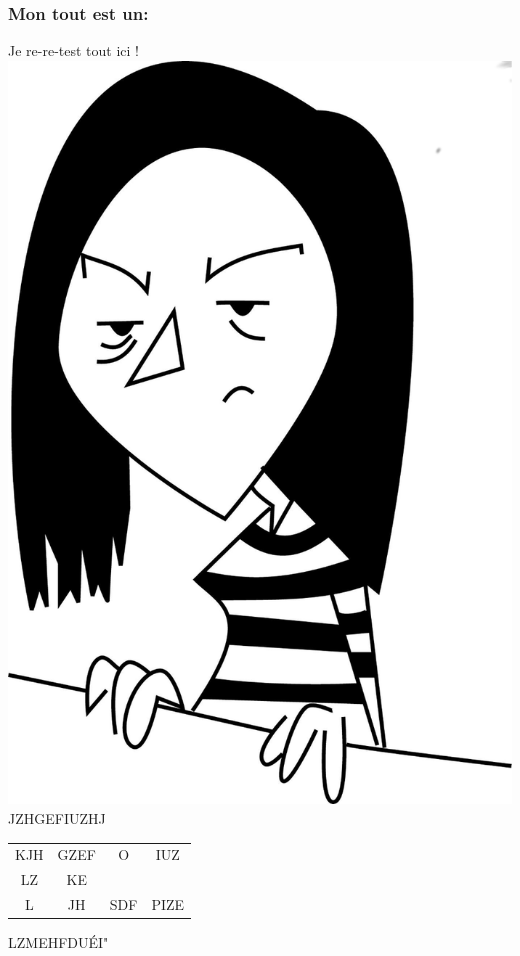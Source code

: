 \documentclass[10pt,a4paper]{report}
\begin{document}
\subsubsection{Mon tout est un:}
Je re-re-test tout ici !
\includegraphics{Mini_Amel.png}
JZHGEFIUZHJ

\begin{tabular}{cccc}
KJH & GZEF & O & IUZ \\
LZ & KE & & \\
L & JH & SDF & PIZE \\
\end{tabular}

LZMEHFDUÉI"
\end{document}
